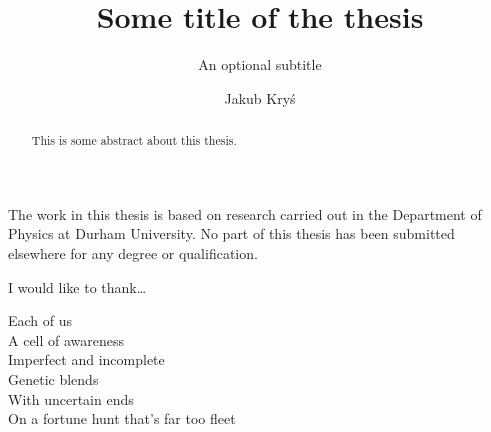 \documentclass[twoside,openright,frontopenright,halfspacing]{ip3thesis}
\begin{document}
\title{Some title of the thesis}
\subtitle{An optional subtitle}
\author{Jakub Kryś}
\maketitlepage*

\begin{abstract}
%
	This is some abstract about this thesis.
%
\end{abstract}

\disableprotrusion
\tableofcontents*
\listoffigures
\listoftables
\enableprotrusion

\begin{declaration*}
%
	The work in this thesis is based on research carried out in the Department of
	Physics at Durham University. No part of this thesis has been
	submitted elsewhere for any degree or qualification.
%
\end{declaration*}

\begin{acknowledgements*}
%
	I would like to thank\ldots
%
\end{acknowledgements*}

\begin{epigraph*}
%
Each of us\\
A cell of awareness\\
Imperfect and incomplete\\
Genetic blends\\
With uncertain ends\\
On a fortune hunt that's far too fleet
%
\end{epigraph*}


\cleardoublepage














\end{document}
